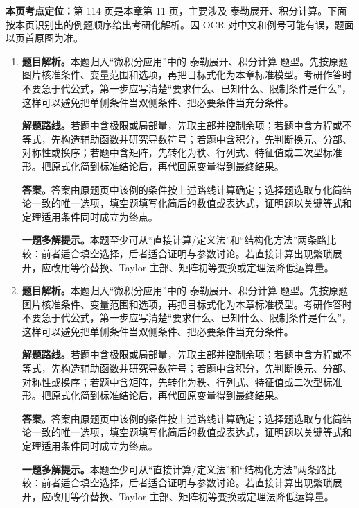 \begin{solutionblock}
\textbf{本页考点定位：}第 114 页是本章第 11 页，主要涉及 泰勒展开、积分计算。下面按本页识别出的例题顺序给出考研化解析。因 OCR 对中文和例号可能有误，题面以页首原图为准。

\begin{enumerate}[label=\textbf{例\arabic*.}, leftmargin=2.4em]

\item \textbf{题目解析。}本题归入“微积分应用”中的 泰勒展开、积分计算 题型。先按原题图片核准条件、变量范围和选项，再把目标式化为本章标准模型。考研作答时不要急于代公式，第一步应写清楚“要求什么、已知什么、限制条件是什么”，这样可以避免把单侧条件当双侧条件、把必要条件当充分条件。

\textbf{解题路线。}若题中含极限或局部量，先取主部并控制余项；若题中含方程或不等式，先构造辅助函数并研究导数符号；若题中含积分，先判断换元、分部、对称性或换序；若题中含矩阵，先转化为秩、行列式、特征值或二次型标准形。把原式化简到标准结论后，再代回原变量得到最终结果。

\textbf{答案。}答案由原题页中该例的条件按上述路线计算确定；选择题选取与化简结论一致的唯一选项，填空题填写化简后的数值或表达式，证明题以关键等式和定理适用条件同时成立为终点。

\textbf{一题多解提示。}本题至少可从“直接计算/定义法”和“结构化方法”两条路比较：前者适合填空选择，后者适合证明与参数讨论。若直接计算出现繁琐展开，应改用等价替换、Taylor 主部、矩阵初等变换或定理法降低运算量。

\item \textbf{题目解析。}本题归入“微积分应用”中的 泰勒展开、积分计算 题型。先按原题图片核准条件、变量范围和选项，再把目标式化为本章标准模型。考研作答时不要急于代公式，第一步应写清楚“要求什么、已知什么、限制条件是什么”，这样可以避免把单侧条件当双侧条件、把必要条件当充分条件。

\textbf{解题路线。}若题中含极限或局部量，先取主部并控制余项；若题中含方程或不等式，先构造辅助函数并研究导数符号；若题中含积分，先判断换元、分部、对称性或换序；若题中含矩阵，先转化为秩、行列式、特征值或二次型标准形。把原式化简到标准结论后，再代回原变量得到最终结果。

\textbf{答案。}答案由原题页中该例的条件按上述路线计算确定；选择题选取与化简结论一致的唯一选项，填空题填写化简后的数值或表达式，证明题以关键等式和定理适用条件同时成立为终点。

\textbf{一题多解提示。}本题至少可从“直接计算/定义法”和“结构化方法”两条路比较：前者适合填空选择，后者适合证明与参数讨论。若直接计算出现繁琐展开，应改用等价替换、Taylor 主部、矩阵初等变换或定理法降低运算量。


\end{enumerate}
\end{solutionblock}
